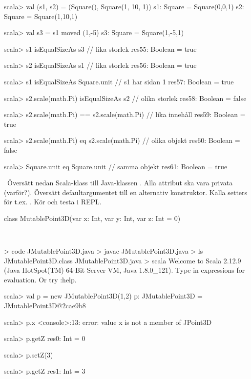 \SubtaskSolved
\begin{REPL}
scala> val (s1, s2) = (Square(), Square(1, 10, 1))
s1: Square = Square(0,0,1)
s2: Square = Square(1,10,1)

scala> val s3 = s1 moved (1,-5)
s3: Square = Square(1,-5,1)

scala> s1 isEqualSizeAs s3       // lika storlek
res55: Boolean = true

scala> s2 isEqualSizeAs s1       // lika storlek
res56: Boolean = true

scala> s1 isEqualSizeAs Square.unit   // s1 har sidan 1
res57: Boolean = true

scala> s2.scale(math.Pi) isEqualSizeAs s2  // olika storlek
res58: Boolean = false

scala> s2.scale(math.Pi) == s2.scale(math.Pi) // lika innehåll
res59: Boolean = true

scala> s2.scale(math.Pi) eq s2.scale(math.Pi)  // olika objekt
res60: Boolean = false

scala> Square.unit eq Square.unit   // samma objekt
res61: Boolean = true
\end{REPL}

\QUESTEND




\QUESTBEGIN

\Task \what~Översätt nedan Scala-klass till Java-klassen . Alla attribut ska vara privata (varför?). Översätt defaultargumentet till en alternativ konstruktor. Kalla setters för t.ex. . Kör  och testa i REPL.

\begin{Code}
class MutablePoint3D(var x: Int, var y: Int, var z: Int = 0)
\end{Code}

\SOLUTION

\TaskSolved \what~


\begin{REPL}
> code JMutablePoint3D.java
> javac JMutablePoint3D.java
> ls
JMutablePoint3D.class  JMutablePoint3D.java
> scala
Welcome to Scala 2.12.9 (Java HotSpot(TM) 64-Bit Server VM, Java 1.8.0_121).
Type in expressions for evaluation. Or try :help.

scala> val p = new JMutablePoint3D(1,2)
p: JMutablePoint3D = JMutablePoint3D@2cae9b8

scala> p.x
<console>:13: error: value x is not a member of JPoint3D

scala> p.getZ
res0: Int = 0

scala> p.setZ(3)

scala> p.getZ
res1: Int = 3

\end{REPL}


